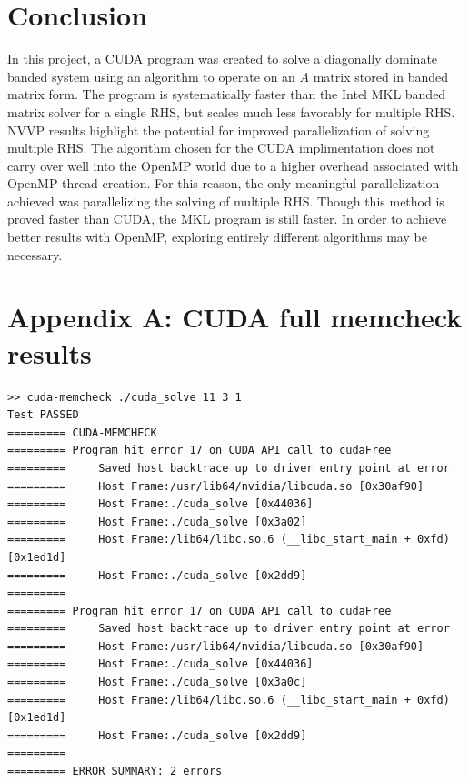 \documentclass[12pt]{article}
\begin{document}
\section{Conclusion}
\label{sec:conclusion}

In this project, a CUDA program was created to solve a diagonally dominate
banded system using an algorithm to operate on an $A$ matrix stored in banded
matrix form. The program is systematically faster than the Intel MKL banded
matrix solver for a single RHS, but scales much less favorably for multiple
RHS. NVVP results highlight the potential for improved parallelization of
solving multiple RHS. The algorithm chosen for the CUDA implimentation
does not carry over well into the OpenMP world due to a higher overhead
associated with OpenMP thread creation. For this reason, the only meaningful
parallelization achieved was parallelizing the solving of multiple RHS. Though
this method is proved faster than CUDA, the MKL program is still faster. In order
to achieve better results with OpenMP, exploring entirely different algorithms
may be necessary.




\newpage
\section{Appendix A: CUDA full memcheck results}

\begin{verbatim}
>> cuda-memcheck ./cuda_solve 11 3 1
Test PASSED
========= CUDA-MEMCHECK
========= Program hit error 17 on CUDA API call to cudaFree
=========     Saved host backtrace up to driver entry point at error
=========     Host Frame:/usr/lib64/nvidia/libcuda.so [0x30af90]
=========     Host Frame:./cuda_solve [0x44036]
=========     Host Frame:./cuda_solve [0x3a02]
=========     Host Frame:/lib64/libc.so.6 (__libc_start_main + 0xfd) [0x1ed1d]
=========     Host Frame:./cuda_solve [0x2dd9]
=========
========= Program hit error 17 on CUDA API call to cudaFree
=========     Saved host backtrace up to driver entry point at error
=========     Host Frame:/usr/lib64/nvidia/libcuda.so [0x30af90]
=========     Host Frame:./cuda_solve [0x44036]
=========     Host Frame:./cuda_solve [0x3a0c]
=========     Host Frame:/lib64/libc.so.6 (__libc_start_main + 0xfd) [0x1ed1d]
=========     Host Frame:./cuda_solve [0x2dd9]
=========
========= ERROR SUMMARY: 2 errors
\end{verbatim}
\end{document}
